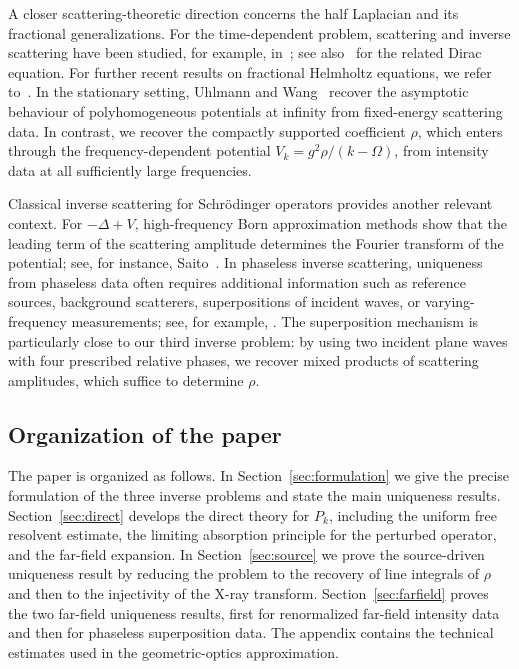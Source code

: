 \documentclass[12pt,a4paper]{amsart}
\numberwithin{equation}{section}
\theoremstyle{plain}
\theoremstyle{definition}
\begin{document}
A closer scattering-theoretic direction concerns the half Laplacian and its
fractional generalizations. For the time-dependent problem, scattering and
inverse scattering have been studied, for example,
in~\cite{Kitada2010,Ishida2020,IshidaWada2020}; see
also~\cite{Jung1997} for the related Dirac equation. For further recent results on fractional Helmholtz
equations, we refer
to~\cite{CovideHoopSalo2025,ZilberbergCakoniVogelius}. In the
stationary setting, Uhlmann and Wang~\cite{Uhlmann_Wang_2025} recover the
asymptotic behaviour of polyhomogeneous potentials at infinity from
fixed-energy scattering data. In contrast, we recover the
compactly supported coefficient $\rho$, which enters through the
frequency-dependent  potential $V_k = g^2\rho/(k-\Omega)$, from intensity data at all sufficiently large frequencies.

Classical inverse scattering for Schr\"odinger operators provides another
relevant context. For $-\Delta+V$, high-frequency Born approximation methods
show that the leading term of the scattering amplitude determines the
Fourier transform of the potential; see, for instance,
Saito~\cite{Saito_1982}. In phaseless inverse scattering, uniqueness from
phaseless data often requires additional information such as reference
sources, background scatterers, superpositions of incident waves, or
varying-frequency measurements; see, for example,
\cite{Klibanov_2014,Klibanov_Romanov_2016,Novikov_2015,Novikov_2016,
Ivanyshyn_Kress_2010}. The superposition mechanism is particularly close to
our third inverse problem: by using two incident plane waves with four
prescribed relative phases, we recover mixed products of scattering
amplitudes, which suffice to determine $\rho$.

\subsection{Organization of the paper}

The paper is organized as follows. In Section~\ref{sec:formulation} we give
the precise formulation of the three inverse problems and state the main
uniqueness results. Section~\ref{sec:direct} develops the direct theory for
$P_k$, including the uniform free resolvent estimate, the limiting absorption
principle for the perturbed operator, and the far-field expansion. In
Section~\ref{sec:source} we prove the source-driven uniqueness result by
reducing the problem to the recovery of line integrals of $\rho$ and then to
the injectivity of the X-ray transform. Section~\ref{sec:farfield} proves
the two far-field uniqueness results, first for renormalized far-field
intensity data and then for phaseless superposition data. The appendix contains the technical estimates used in the geometric-optics approximation.
\end{document}
